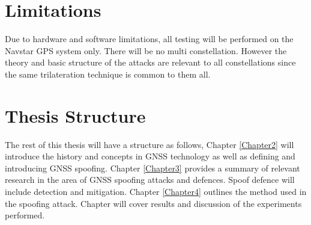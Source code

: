 \section{Limitations}\label{sec:Limits}
Due to hardware and software limitations, all testing will be performed on the Navstar GPS system only. There will be no multi constellation. However the theory and basic
structure of the attacks are relevant to all constellations since the same trilateration technique is common to them all.

\section{Thesis Structure}\label{sec:structure}
The rest of this thesis will have a structure as follows, Chapter \ref{Chapter2} will introduce the history and concepts in GNSS technology as well as defining and
introducing GNSS spoofing. Chapter \ref{Chapter3} provides a summary of relevant research in the area of GNSS spoofing attacks and defences. Spoof defence will include
detection and mitigation. Chapter \ref{Chapter4} outlines the method used in the spoofing attack. Chapter will cover results and discussion of the experiments performed.
